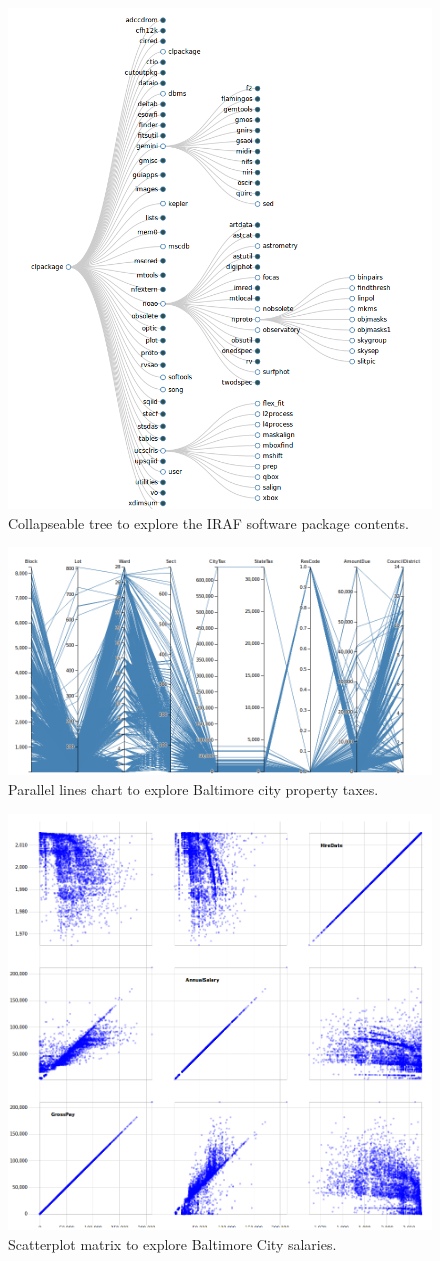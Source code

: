 \documentclass[a4paper,11pt]{article}
\begin{document}
\begin{figure}[h!]
\caption{Collapseable tree to explore the IRAF software package contents.} 
\centering
\includegraphics[width=.8\textwidth]{iraf_plot.png}
\end{figure}


\begin{figure}[h!]
\caption{Parallel lines chart to explore Baltimore city property taxes.} 
\centering
\includegraphics[width=.8\textwidth]{parallel_lines.png}
\end{figure}

\begin{figure}[h!]
\caption{Scatterplot matrix to explore Baltimore City salaries.} 
\centering
\includegraphics[width=.8\textwidth]{scatterplot.png}
\end{figure}


\end{document}
